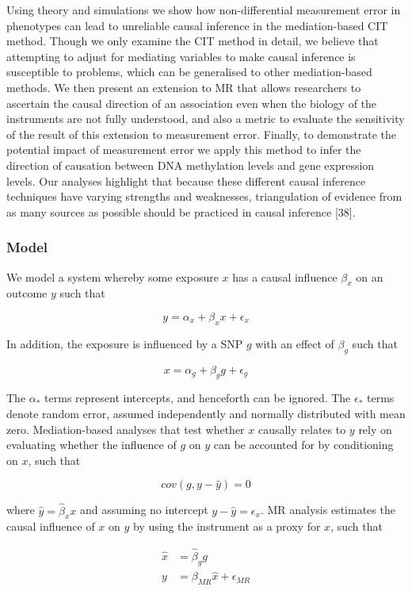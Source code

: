 \documentclass[]{article}
\begin{document}
Using theory and simulations we show how non-differential measurement
error in phenotypes can lead to unreliable causal inference in the
mediation-based CIT method. Though we only examine the CIT method in
detail, we believe that attempting to adjust for mediating variables to
make causal inference is susceptible to problems, which can be
generalised to other mediation-based methods. We then present an
extension to MR that allows researchers to ascertain the causal
direction of an association even when the biology of the instruments are
not fully understood, and also a metric to evaluate the sensitivity of
the result of this extension to measurement error. Finally, to
demonstrate the potential impact of measurement error we apply this
method to infer the direction of causation between DNA methylation
levels and gene expression levels. Our analyses highlight that because
these different causal inference techniques have varying strengths and
weaknesses, triangulation of evidence from as many sources as possible
should be practiced in causal inference {[}38{]}.

\subsubsection{Model}\label{model}

We model a system whereby some exposure \(x\) has a causal influence
\(\beta_x\) on an outcome \(y\) such that

\[
y = \alpha_x + \beta_x x + \epsilon_x
\]

In addition, the exposure is influenced by a SNP \(g\) with an effect of
\(\beta_g\) such that

\[
x = \alpha_g + \beta_g g + \epsilon_g
\]

The \(\alpha_*\) terms represent intercepts, and henceforth can be
ignored. The \(\epsilon_*\) terms denote random error, assumed
independently and normally distributed with mean zero. Mediation-based
analyses that test whether \(x\) causally relates to \(y\) rely on
evaluating whether the influence of \(g\) on \(y\) can be accounted for
by conditioning on \(x\), such that

\[
cov(g, y - \hat{y}) = 0
\]

where \(\hat{y} = \hat{\beta}_x x\) and assuming no intercept
\(y - \hat{y} = \epsilon_x\). MR analysis estimates the causal influence
of \(x\) on \(y\) by using the instrument as a proxy for \(x\), such
that

\[
\begin{aligned}
\hat{x} & = \hat{\beta}_g g \\
y       & = \beta_{MR}\hat{x} + \epsilon_{MR}
\end{aligned}
\]
\end{document}

